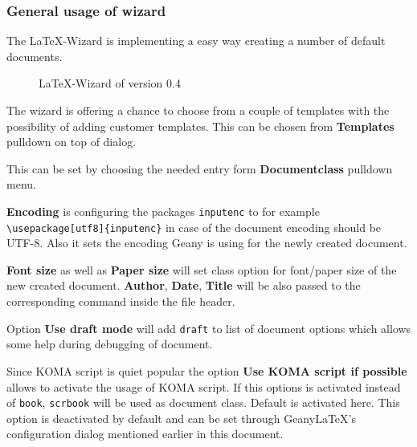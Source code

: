 \documentclass[%
a4paper,%
10pt,%
oneside,%
DIV18,
headsepline,
plainheadsepline,
footsepline,
plainfootsepline,
bibtotoc,%
liststotoc,%
BCOR12mm,%
halfparskip,%
openany,%
]{scrartcl}
\begin{document}
\subsubsection{General usage of wizard}
The \LaTeX-Wizard is implementing a easy way creating a number of
default documents.
\begin{figure}[h!]
	\caption{\LaTeX-Wizard of version 0.4}
\end{figure}

The wizard is offering a chance to choose from a couple of templates 
with the possibility of adding customer templates. This can be 
chosen from \textbf{Templates} pulldown on top of dialog. 

This can be set by choosing the needed entry form
\textbf{Documentclass} pulldown menu.

\textbf{Encoding} is configuring the packages \texttt{inputenc} to
for example \texttt{\textbackslash usepackage[utf8]\{inputenc\}} in
case of the document encoding should be UTF-8. Also it sets the
encoding Geany is using for the newly created document.

\textbf{Font size} as well as \textbf{Paper size} will set class option
for font/paper size of the new created document. \textbf{Author},
\textbf{Date}, \textbf{Title} will be also passed to the corresponding
command inside the file header.

Option \textbf{Use draft mode} will add \texttt{draft} to list of
document options which allows some help during debugging of document.

Since KOMA script is quiet popular the option \textbf{Use KOMA script
if possible} allows to activate the usage of KOMA script. If this
options is activated instead of \texttt{book}, \texttt{scrbook} will
be used as document class. Default is activated here. This option is
deactivated by default and can be set through Geany\LaTeX{}'s
configuration dialog mentioned earlier in this document.
\end{document}
